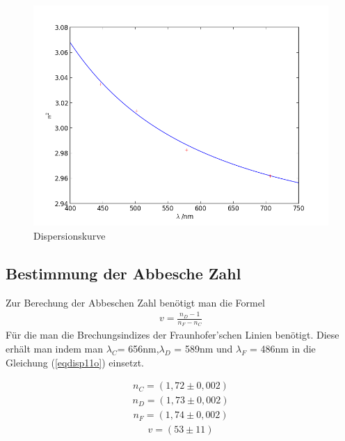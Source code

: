 \begin{figure}[h]
	\centering
		\includegraphics[width=1.00\textwidth]{Plot1B.png}
		\caption{Dispersionskurve}
	\label{Dispersionskurve}
\end{figure}

\subsection{Bestimmung der Abbesche Zahl}
Zur Berechung der Abbeschen Zahl benötigt man die Formel
\begin{align}
v=\frac{n_D-1}{n_F-n_C}\nonumber
\end{align}
Für die man die Brechungsindizes der Fraunhofer'schen Linien benötigt. Diese erhält man
indem man $\lambda_C$= 656nm,$\lambda_D$ = 589nm und $\lambda_F$ = 486nm in die Gleichung (\ref{eqdisp11o}) einsetzt.

\begin{align}
n_C= (1,72\pm0,002)\nonumber
\end{align}
\begin{align}
n_D= (1,73\pm0,002)\nonumber
\end{align}
\begin{align}
n_F= (1,74\pm0,002)\nonumber
\end{align}
\begin{align}
v= (53\pm11) \nonumber
\end{align}

